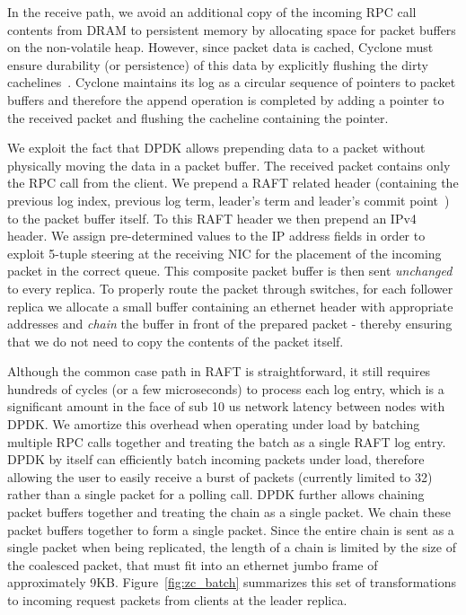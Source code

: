 \documentclass[letterpaper,twocolumn,10pt]{article}
\begin{document}
In the receive path, we avoid an additional copy of the incoming RPC call
contents from DRAM to persistent memory by allocating space for packet buffers
on the non-volatile heap. However, since packet data is cached, Cyclone must
ensure durability (or persistence) of this data by explicitly flushing the dirty
cachelines~\cite{pmfs}. Cyclone maintains its log as a circular sequence of
pointers to packet buffers and therefore the append operation is completed by
adding a pointer to the received packet and flushing the cacheline containing
the pointer.

We exploit the fact that DPDK allows prepending data to a packet
without physically moving the data in a packet buffer. The received packet
contains only the RPC call from the client. We prepend a RAFT related header
(containing the previous log index, previous log term, leader's term and
leader's commit point~\cite{raft}) to the packet buffer itself. To this RAFT header 
we then prepend an IPv4 header. We assign pre-determined values to the
IP address fields in order to exploit 5-tuple steering at the receiving NIC for 
the placement of the incoming packet in the correct queue.
This composite packet buffer is then sent \emph{unchanged} to every replica.
To properly route the packet through switches, for each follower replica we
allocate a small buffer containing an ethernet header with appropriate addresses
and \emph{chain} the buffer in front of the prepared packet - thereby ensuring
that we do not need to copy the contents of the packet itself.

Although the common case path in RAFT is straightforward, it still requires
hundreds of cycles (or a few microseconds) to process each log entry, which is a
significant amount in the face of sub 10 us network latency between nodes with
DPDK. We amortize this overhead when operating under load by batching multiple
RPC calls together and treating the batch as a single RAFT log entry.  DPDK by
itself can efficiently batch incoming packets under load, therefore allowing the
user to easily receive a burst of packets (currently limited to 32) rather than
a single packet for a polling call.  DPDK further allows chaining packet buffers
together and treating the chain as a single packet. We chain these packet
buffers together to form a single packet. Since the entire chain is sent as a
single packet when being replicated, the length of a chain is limited by the
size of the coalesced packet, that must fit into an ethernet jumbo frame of
approximately 9KB. Figure~\ref{fig:zc_batch} summarizes this set of
transformations to incoming request packets from clients at the leader replica. 
\end{document}
